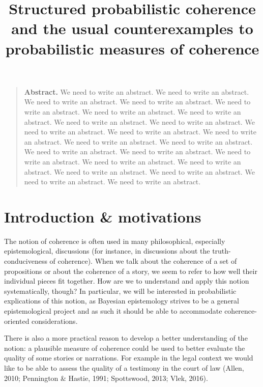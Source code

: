\documentclass[
  10pt,
]{scrartcl}
\title{Structured probabilistic coherence \linebreak and the usual counterexamples to probabilistic measures of coherence}
\author{}
\date{\vspace{-2.5em}}
\begin{document}
\maketitle

\setlength{\abovedisplayskip}{-10pt}
\setlength{\belowdisplayskip}{5pt}

\begin{quote}\textbf{Abstract.}
We need to write an abstract. We need to write an abstract. We need to write an abstract. We need to write an abstract. We need to write an abstract. We need to write an abstract. We need to write an abstract. We need to write an abstract. We need to write an abstract. We need to write an abstract. We need to write an abstract. We need to write an abstract. We need to write an abstract. We need to write an abstract. We need to write an abstract. We need to write an abstract. We need to write an abstract. We need to write an abstract. We need to write an abstract. We need to write an abstract. We need to write an abstract. We need to write an abstract. We need to write an abstract. 
\end{quote}

\hypertarget{introduction-motivations}{%
\section{Introduction \& motivations}\label{introduction-motivations}}

The notion of coherence is often used in many philosophical, especially epistemological, discussions (for instance, in discussions about the truth-conduciveness of coherence). When we talk about the coherence of a set of propositions or about the coherence of a story, we seem to refer to how well their individual pieces fit together. How are we to understand and apply this notion systematically, though? In particular, we will be interested in probabilistic explications of this notion, as Bayesian epistemology strives to be a general epistemological project and as such it should be able to accommodate coherence-oriented considerations.

There is also a more practical reason to develop a better understanding of the notion: a plausible measure of coherence could be used to better evaluate the quality of some stories or narrations. For example in the legal context we would like to be able to assess the quality of a testimony in the court of law (Allen, 2010; Pennington \& Hastie, 1991; Spottswood, 2013; Vlek, 2016).
\end{document}
